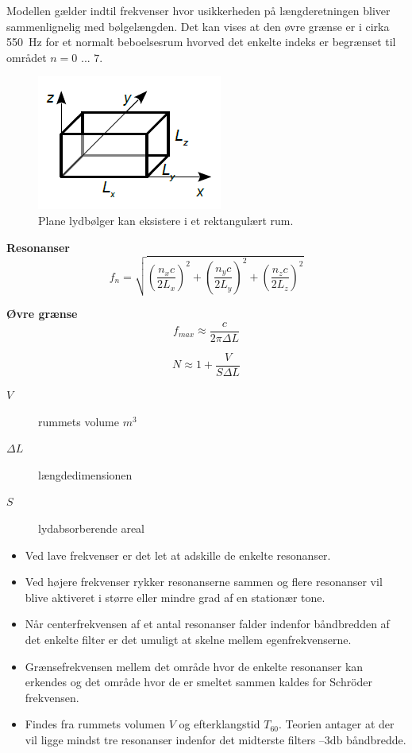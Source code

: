 Modellen gælder indtil frekvenser hvor usikkerheden på længderetningen
bliver sammenlignelig med bølgelængden. 
Det kan vises at den øvre grænse er i cirka \SI{550}{\hertz} for
et normalt beboelsesrum hvorved det enkelte indeks er begrænset til området $n = 0$ ... $7$.

\begin{figure} [H]
	\centering
	\includegraphics[width=.4\linewidth]{graphics/13.png}
	\caption{Plane lydbølger kan eksistere i et rektangulært rum.}
	\label{fig:13}
\end{figure}
\noindent\textbf{Resonanser}
\begin{equation}
f_n = \sqrt{\left(\dfrac{n_x c}{2 L_x}\right)^2 + \left(\dfrac{n_y c}{2 L_y}\right)^2 + \left(\dfrac{n_z c}{2 L_z}\right)^2}
\end{equation}

\noindent\textbf{Øvre grænse}
\begin{equation}
f_{max}\approx \dfrac{c}{2\pi \Delta L}
\end{equation}

\begin{equation}
N \approx 1 +\dfrac{V}{S \Delta L}
\end{equation}

\begin{description}
	\item[$V$] rummets volume $m^3$
	\item[$\Delta L$] længdedimensionen
	\item[$S$] lydabsorberende areal
\end{description}
\newpage
\begin{itemize}
	\item Ved lave frekvenser er det let at adskille de enkelte resonanser.
	\item Ved højere frekvenser rykker resonanserne sammen og flere resonanser vil blive aktiveret i større eller mindre grad af en stationær tone. 
	\item Når centerfrekvensen af et antal	resonanser falder indenfor båndbredden af det enkelte filter er det umuligt at skelne mellem
	egenfrekvenserne.
	\item Grænsefrekvensen mellem det område hvor de enkelte resonanser kan erkendes og det område	hvor de er smeltet sammen kaldes for Schröder frekvensen. 
	\item Findes fra rummets volumen $V$ og efterklangstid $T_{60}$. Teorien antager at der vil ligge mindst	tre resonanser indenfor det midterste filters $–3 \si{\decibel}$ båndbredde.
\end{itemize}

